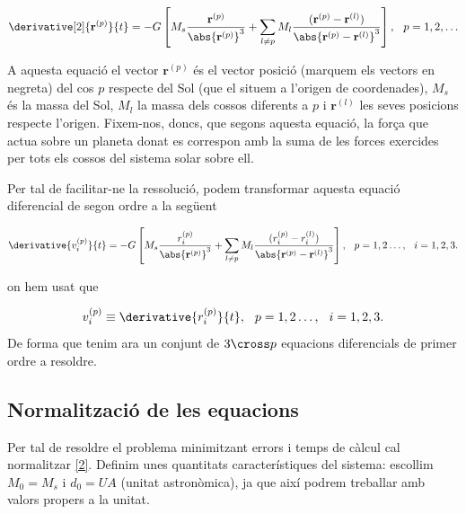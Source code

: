 \documentclass[10pt, twoside]{article}
\begin{document}
\begin{equation}
    \derivative[2]{\mathbf{r}^{(p)}}{t} = - G \left[ M_s \frac{\mathbf{r}^{(p)}}{\abs{
    \mathbf{r}^{(p)}}^3} + \sum_{l \neq p} M_l \frac{(\mathbf{r}^{(p)}-\mathbf{r}^{(l)})}{\abs{\mathbf{r}^{(p)} - \mathbf{r}^{(l)}}^3}\right], \hspace{0.25cm} p = 1, 2, \ldots 
\end{equation}

A aquesta equació el vector $\mathbf{r}^{(p)}$ és el vector posició (marquem els vectors en negreta) del cos $p$ respecte del Sol (que el situem a l'origen de coordenades), $M_s$ és la massa del Sol, $M_l$ la massa dels cossos diferents a $p$ i $\mathbf{r}^{(l)}$ les seves posicions respecte l'origen. Fixem-nos, doncs, que segons aquesta equació, la força que actua sobre un planeta donat es correspon amb la suma de les forces exercides per tots els cossos del sistema solar sobre ell. 

Per tal de facilitar-ne la ressolució, podem transformar aquesta equació diferencial de segon ordre a la següent

\begin{equation}
    \derivative{v_i^{(p)}}{t} = -G \left[ M_s \frac{r_i^{(p)}}{\abs{
        \mathbf{r}^{(p)}}^3} + \sum_{l \neq p} M_l\frac{(r_i^{(p)}-r_i^{(l)})}{\abs{\mathbf{r}^{(p)} - \mathbf{r}^{(l)}}^3} \right], \hspace{0.25cm} p = 1,2 \ldots, \hspace{0.25cm} i = 1,2,3. \label{2}
\end{equation}

on hem usat que

\begin{equation}
    v_i^{(p)} \equiv \derivative{r_i^{(p)}}{t}, \hspace{0.25cm} p = 1,2 \ldots, \hspace{0.25cm} i = 1,2,3.
\end{equation}
De forma que tenim ara un conjunt de $3 \cross p$ equacions diferencials de primer ordre a resoldre.

\subsection{Normalització de les equacions}
Per tal de resoldre el problema minimitzant errors i temps de càlcul cal normalitzar \eqref{2}. Definim unes quantitats característiques del sistema: escollim $M_0 = M_s$ i $d_0 = UA$ (unitat astronòmica), ja que així podrem treballar amb valors propers a la unitat.
\end{document}
